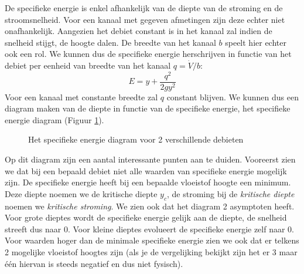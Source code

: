 De specifieke energie is enkel afhankelijk van de diepte van de stroming en de stroomsnelheid. Voor een kanaal met gegeven afmetingen zijn deze echter niet onafhankelijk. Aangezien het debiet constant is in het kanaal zal indien de snelheid stijgt, de hoogte dalen. De breedte van het kanaal $b$ speelt hier echter ook een rol. We kunnen dus de specifieke energie herschrijven in functie van het debiet per eenheid van breedte van het kanaal $q = \dot{V}/b$:
\begin{equation}
	E = y + \frac{q^2}{2 g y^2}
\end{equation}
Voor een kanaal met constante breedte zal $q$ constant blijven. We kunnen dus een diagram maken van de diepte in functie van de specifieke energie, het specifieke energie diagram (Figuur \ref{fig:Specifieke_energie_diagram}).
\begin{figure}[htb]
	\centering
	
	\caption{Het specifieke energie diagram voor 2 verschillende debieten}
	\label{fig:Specifieke_energie_diagram}
\end{figure}
Op dit diagram zijn een aantal interessante punten aan te duiden. Vooreerst zien we dat bij een bepaald debiet niet alle waarden van specifieke energie mogelijk zijn. De specifieke energie heeft bij een bepaalde vloeistof hoogte een minimum. Deze diepte noemen we de kritische diepte $y_c$, de stroming bij de \emph{kritische diepte} noemen we \emph{kritische stroming}. We zien ook dat het diagram 2 asymptoten heeft. Voor grote dieptes wordt de specifieke energie gelijk aan de diepte, de snelheid streeft dus naar 0. Voor kleine dieptes evolueert de specifieke energie zelf naar 0. Voor waarden hoger dan de minimale specifieke energie zien we ook dat er telkens 2 mogelijke vloeistof hoogtes zijn (als je de vergelijking bekijkt zijn het er 3 maar één hiervan is steeds negatief en dus niet fysisch).

